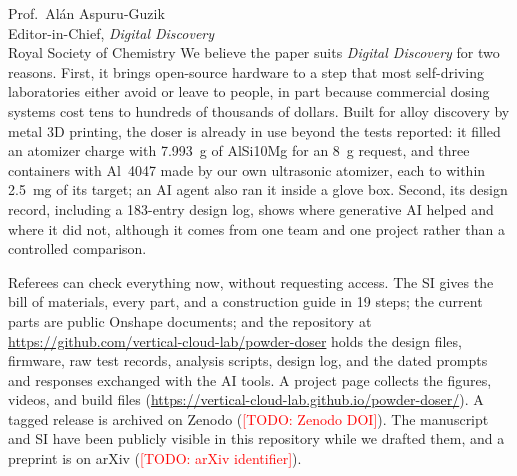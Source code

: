 \documentclass[11pt]{letter}
\newcommand{\TODO}[1]{\textcolor{red}{[TODO: #1]}}
\begin{document}
\begin{letter}{Prof.\ Al\'an Aspuru-Guzik\\
Editor-in-Chief, \textit{Digital Discovery}\\
Royal Society of Chemistry}
We believe the paper suits \textit{Digital Discovery} for two reasons. First, it brings open-source hardware to a step that most self-driving laboratories either avoid or leave to people, in part because commercial dosing systems cost tens to hundreds of thousands of dollars. Built for alloy discovery by metal 3D printing, the doser is already in use beyond the tests reported: it filled an atomizer charge with 7.993~g of AlSi10Mg for an 8~g request, and three containers with Al~4047 made by our own ultrasonic atomizer, each to within 2.5~mg of its target; an AI agent also ran it inside a glove box. Second, its design record, including a 183-entry design log, shows where generative AI helped and where it did not, although it comes from one team and one project rather than a controlled comparison.

Referees can check everything now, without requesting access. The SI gives the bill of materials, every part, and a construction guide in 19 steps; the current parts are public Onshape documents; and the repository at \url{https://github.com/vertical-cloud-lab/powder-doser} holds the design files, firmware, raw test records, analysis scripts, design log, and the dated prompts and responses exchanged with the AI tools. A project page collects the figures, videos, and build files (\url{https://vertical-cloud-lab.github.io/powder-doser/}). A tagged release is archived on Zenodo (\TODO{Zenodo DOI}). The manuscript and SI have been publicly visible in this repository while we drafted them, and a preprint is on arXiv (\TODO{arXiv identifier}).


\end{letter}
\end{document}
